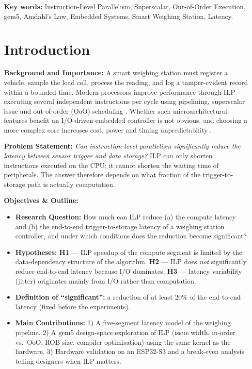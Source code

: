\documentclass[12pt, a4paper]{article}
\begin{document}
\vspace{0.3cm}
\noindent \textbf{Key words:} Instruction-Level Parallelism, Superscalar, Out-of-Order Execution, gem5, Amdahl's Law, Embedded Systems, Smart Weighing Station, Latency.

\newpage

\section{Introduction}
\noindent \textbf{Background and Importance:} A smart weighing station must register a vehicle, sample the load cell, process the reading, and log a tamper-evident record within a bounded time. Modern processors improve performance through ILP --- executing several independent instructions per cycle using pipelining, superscalar issue and out-of-order (OoO) scheduling \cite{SmithSohi1995}. Whether such microarchitectural features benefit an I/O-driven embedded controller is not obvious, and choosing a more complex core increases cost, power and timing unpredictability \cite{Wilhelm2008}.

\vspace{0.2cm}
\noindent \textbf{Problem Statement:} \textit{Can instruction-level parallelism significantly reduce the latency between sensor trigger and data storage?} ILP can only shorten instructions executed on the CPU; it cannot shorten the waiting time of peripherals. The answer therefore depends on what fraction of the trigger-to-storage path is actually computation.

\vspace{0.2cm}
\noindent \textbf{Objectives \& Outline:}
\begin{itemize}
    \item \textbf{Research Question:} How much can ILP reduce (a) the compute latency and (b) the end-to-end trigger-to-storage latency of a weighing station controller, and under which conditions does the reduction become significant?
    \item \textbf{Hypotheses:} \textbf{H1} --- ILP speedup of the compute segment is limited by the data-dependency structure of the algorithm. \textbf{H2} --- ILP does \emph{not} significantly reduce end-to-end latency because I/O dominates. \textbf{H3} --- latency variability (jitter) originates mainly from I/O rather than computation.
    \item \textbf{Definition of ``significant'':} a reduction of at least 20\% of the end-to-end latency (fixed before the experiments).
    \item \textbf{Main Contributions:} 1) A five-segment latency model of the weighing pipeline. 2) A gem5 design-space exploration of ILP (issue width, in-order vs.\ OoO, ROB size, compiler optimisation) using the same kernel as the hardware. 3) Hardware validation on an ESP32-S3 and a break-even analysis telling designers when ILP matters.
\end{itemize}
\end{document}
